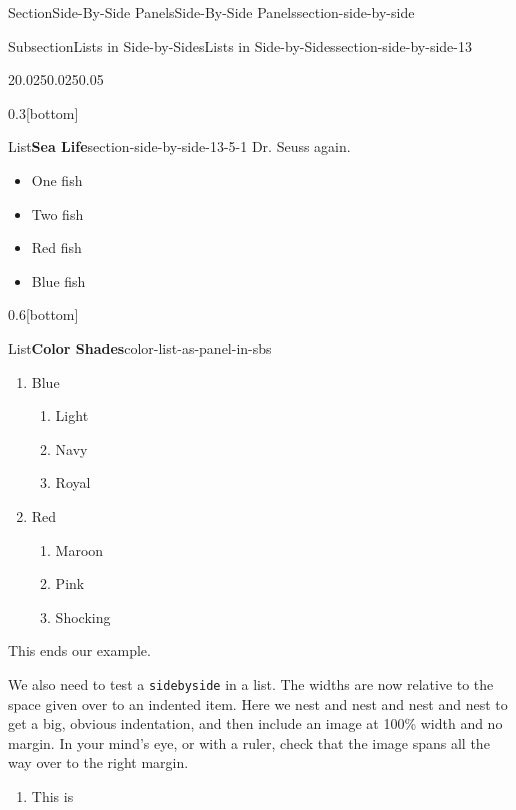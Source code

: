 \documentclass[twoside,10pt,]{article}
\newcommand{\mono}[1]{\texttt{#1}}
\numberwithin{equation}{section}
\begin{document}
\begin{sectionptx}{Section}{Side-By-Side Panels}{}{Side-By-Side Panels}{}{}{section-side-by-side}
\begin{subsectionptx}{Subsection}{Lists in Side-by-Sides}{}{Lists in Side-by-Sides}{}{}{section-side-by-side-13}
\begin{sidebyside}{2}{0.025}{0.025}{0.05}
\begin{sbspanel}{0.3}[bottom]%
\begin{panellistptx}{List}{\textbf{Sea Life}}{section-side-by-side-13-5-1}{}%
Dr. Seuss again.%
%
\begin{itemize}[label=\textbullet]
\item{}One fish\protect\footnotemark{}%
\item{}Two fish%
\item{}Red fish%
\item{}Blue fish%
\end{itemize}
\tcblower
\end{panellistptx}%
\end{sbspanel}%
\begin{sbspanel}{0.6}[bottom]%
\begin{panellistptx}{List}{\textbf{Color Shades}}{color-list-as-panel-in-sbs}{}%
%
%
\begin{enumerate}
\item{}Blue%
\begin{enumerate}
\item{}Light%
\item{}Navy%
\item{}Royal%
\end{enumerate}
%
\item{}Red\protect\footnotemark{}%
\begin{enumerate}
\item{}Maroon%
\item{}Pink%
\item{}Shocking%
\end{enumerate}
%
\end{enumerate}
This ends our example.%
\tcblower
\end{panellistptx}%
\end{sbspanel}%
\end{sidebyside}%
%
%
\par
We also need to test a \mono{sidebyside} in a list.  The widths are now relative to the space given over to an indented item.  Here we nest and nest and nest and nest to get a big, obvious indentation, and then include an image at 100\% width and no margin.  In your mind's eye, or with a ruler, check that the image spans all the way over to the right margin.%
\begin{enumerate}
\item{}This is%

\end{enumerate}
\end{subsectionptx}
\end{sectionptx}
\end{document}
